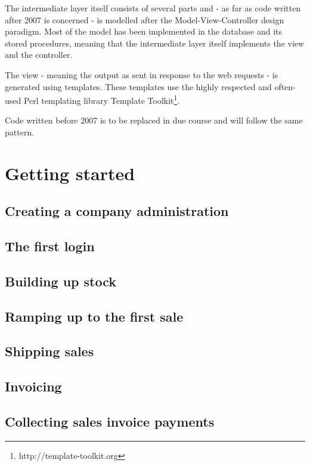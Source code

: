 \documentclass[10pt,A4]{book}
\begin{document}
The intermediate layer itself consists of several parts and - as far as code written
after 2007 is concerned - is modelled after the Model-View-Controller design paradigm.
Most of the model has been implemented in the database and its stored procedures, meaning
that the intermediate layer itself implements the view and the controller.

The view - meaning the output as sent in response to the web requests - is generated
using templates.  These templates use the highly respected and often-used Perl templating
library Template Toolkit\footnote{http://template-toolkit.org}.

Code written before 2007 is to be replaced in due course and will follow the same
pattern.


\part{Getting started}
\label{part:GettingStarted}

\chapter{Creating a company administration}

\chapter{The first login}

\chapter{Building up stock}

\chapter{Ramping up to the first sale}


\chapter{Shipping sales}

\chapter{Invoicing}

\chapter{Collecting sales invoice payments}
\end{document}
